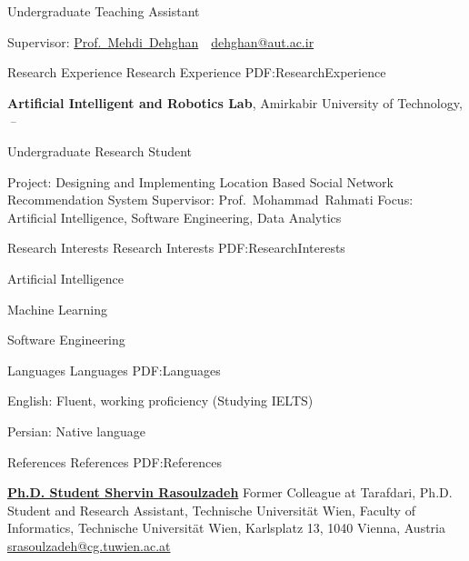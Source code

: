 \documentclass[letterpaper,MMMyyyy,nonstopmode]{resume}
\begin{document}
\begin{Body}
\Gap
\BulletItem
Undergraduate Teaching Assistant
\begin{Detail}
\SubBulletItem
Supervisor:
\href{https://aut.ac.ir/cv/2123/Mehdi-Dehghan-Takht-Fooladi?slc_lang=en&&cv=2123&mod=scv}
{Prof.~Mehdi~Dehghan}
\,\SubBulletSymbol\,
\href{mailto:dehghan@aut.ac.ir}
{dehghan@aut.ac.ir}
\end{Detail}


\Section
{Research Experience}
{Research Experience}
{PDF:ResearchExperience}

\Entry
\textbf{Artificial Intelligent and Robotics Lab},
Amirkabir University of Technology,
\hfill
\textsl{\small{\,--\,}}

\Gap
\BulletItem
Undergraduate Research Student
\begin{Detail}
\SubBulletItem
Project:
Designing and Implementing Location Based Social Network Recommendation System
\SubBulletItem
Supervisor:
Prof.~Mohammad~Rahmati
\SubBulletItem
Focus: Artificial Intelligence, Software Engineering, Data Analytics
\end{Detail}


\Section
{Research Interests}
{Research Interests}
{PDF:ResearchInterests}

\BulletItem
Artificial Intelligence

\Gap
\BulletItem
Machine Learning

\Gap
\BulletItem
Software Engineering


\Section
{Languages}
{Languages}
{PDF:Languages}

\BulletItem
English: Fluent, working proficiency (Studying IELTS)

\Gap
\BulletItem
Persian: Native language


\Section
{References}
{References}
{PDF:References}

\BulletItem
\href{https://www.linkedin.com/in/srasoulzadeh}
{\textbf{Ph.D. Student Shervin Rasoulzadeh}}
\newline
Former Colleague at Tarafdari,
\newline
Ph.D. Student and Research Assistant, Technische Universität Wien,
\newline
Faculty of Informatics, Technische Universität Wien, Karlsplatz 13, 1040 Vienna, Austria
\newline
\href{mailto:srasoulzadeh@cg.tuwien.ac.at}
{srasoulzadeh@cg.tuwien.ac.at}


\end{Body}
\end{document}

